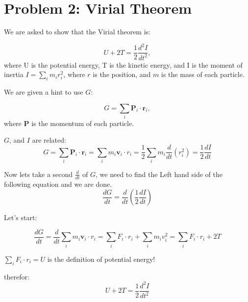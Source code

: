 \section*{Problem 2: Virial Theorem}

We are asked to show that the Virial theorem is:

\begin{equation}
    U + 2T = \frac{1}{2}\frac{d^2I}{dt^2},
\end{equation}
where U is the potential energy, T is the kinetic energy, and I is the moment of inertia $I = \sum_i m_ir_i^2$, where $r$ is the position, and $m$ is the mass of each particle. 

We are given a hint to use $G$:

\begin{equation}
    G = \sum_i\boldsymbol{P}_i \cdot \boldsymbol{r}_i,
\end{equation}
where $\boldsymbol{P}$ is the momentum of each particle. 


$G$, and $I$ are related:
\begin{equation}
    G = \sum_i\boldsymbol{P}_i \cdot \boldsymbol{r}_i = \sum_im_i \boldsymbol{v}_i \cdot r_i = \frac{1}{2}\sum_im_i \frac{d}{dt}(r_i^2) = \frac{1}{2}\frac{dI}{dt}
\end{equation}

Now lets take a second $\frac{d}{dt}$ of $G$, we need to find the Left hand side of the following equation and we are done. 
\begin{equation}
    \frac{dG}{dt} = \frac{d}{dt}(\frac{1}{2}\frac{dI}{dt}) 
\end{equation}

Let's start:

\begin{equation}
    \frac{dG}{dt} = \frac{d}{dt}\sum_im_i \boldsymbol{v}_i \cdot r_i = \sum_i F_i \cdot r_i + \sum_i m_iv_i^2 = \sum_i F_i \cdot r_i  + 2T
\end{equation}

$\sum_i F_i \cdot r_i = U$ is the definition of potential energy!

therefor:
\begin{equation}
    \boxed{U + 2T =  \frac{1}{2}\frac{d^2I}{dt^2} }
\end{equation}









